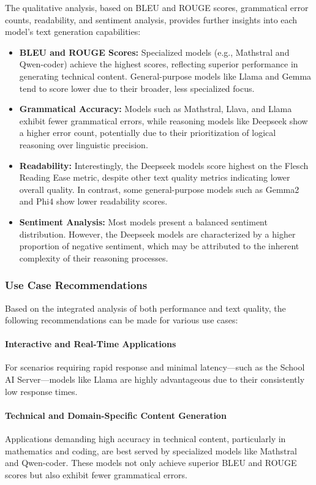 The qualitative analysis, based on BLEU and ROUGE scores, grammatical error counts, readability, and sentiment analysis, provides further insights into each model's text generation capabilities:
\begin{itemize}
  \item \textbf{BLEU and ROUGE Scores:} Specialized models (e.g., Mathstral and Qwen-coder) achieve the highest scores, reflecting superior performance in generating technical content. General-purpose models like Llama and Gemma tend to score lower due to their broader, less specialized focus.
  \item \textbf{Grammatical Accuracy:} Models such as Mathstral, Llava, and Llama exhibit fewer grammatical errors, while reasoning models like Deepseek show a higher error count, potentially due to their prioritization of logical reasoning over linguistic precision.
  \item \textbf{Readability:} Interestingly, the Deepseek models score highest on the Flesch Reading Ease metric, despite other text quality metrics indicating lower overall quality. In contrast, some general-purpose models such as Gemma2 and Phi4 show lower readability scores.
  \item \textbf{Sentiment Analysis:} Most models present a balanced sentiment distribution. However, the Deepseek models are characterized by a higher proportion of negative sentiment, which may be attributed to the inherent complexity of their reasoning processes.
\end{itemize}

\subsubsection{Use Case Recommendations}

Based on the integrated analysis of both performance and text quality, the following recommendations can be made for various use cases:

\paragraph{Interactive and Real-Time Applications} 
For scenarios requiring rapid response and minimal latency—such as the School AI Server—models like Llama are highly advantageous due to their consistently low response times.

\paragraph{Technical and Domain-Specific Content Generation} 
Applications demanding high accuracy in technical content, particularly in mathematics and coding, are best served by specialized models like Mathstral and Qwen-coder. These models not only achieve superior BLEU and ROUGE scores but also exhibit fewer grammatical errors.

